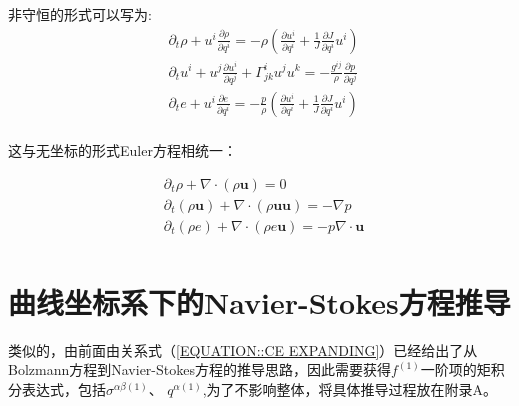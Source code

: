 \documentclass[LBMDerivation.tex]{subfiles}
\begin{document}
非守恒的形式可以写为:
\begin{equation}
  \boxed{
    \begin{aligned}
       & \partial_{t} \rho+ u^i \frac{\partial \rho}{\partial q^i}=-\rho (\frac{\partial u^i}{\partial q^i}+  \frac{1}{J} \frac{\partial J}{\partial q^i}u^i)
      \\
       & \partial_{t}u^{i}+u^j \frac{\partial u^i}{\partial q^{j}}+\Gamma_{j k}^{i}  u^{j} u^{k} =-\frac{g^{i j}}{\rho} \frac{\partial p}{\partial q^{j}}                    \\
       & \partial_{t}e + u^i\frac{\partial e}{\partial  q^{i}}  = -  \frac{p}{\rho} (\frac{\partial  u^i}{\partial q^{i}}  + \frac{1}{J} \frac{\partial J}{\partial q^i}u^i) \\
    \end{aligned}
  }
  \label{EQUATION::Eluer非守恒} ~
\end{equation}


这与无坐标的形式Euler方程相统一：


\begin{equation}
  \begin{aligned}
     & \partial_t \rho + \nabla \cdot (\rho \boldsymbol{u})=0                                                      \\
     & \partial_{t}\left(\rho \boldsymbol{u} \right)+ \nabla \cdot (\rho \boldsymbol{u} \boldsymbol{u}) =-\nabla p \\
     & \partial_{t}\left(\rho e \right) + \nabla \cdot (\rho e \boldsymbol{u})=-p \nabla \cdot \boldsymbol{u}      \\
  \end{aligned}
  \label{EQUATION::Eluer2} ~
\end{equation}
%
%


%
%
%
%
%
\section{曲线坐标系下的Navier-Stokes方程推导}
%
%

类似的，由前面由关系式（\ref{EQUATION::CE EXPANDING}）已经给出了从Bolzmann方程到Navier-Stokes方程的推导思路，因此需要获得$f^{(1)}$一阶项的矩积分表达式，包括$\sigma^{\alpha\beta(1)}$、 $q^{\alpha (1)}$,为了不影响整体，将具体推导过程放在附录A。
\end{document}
